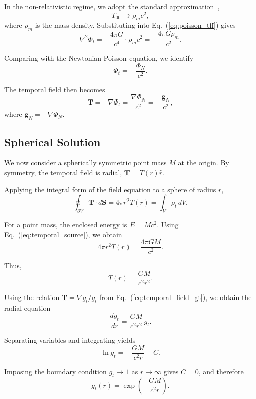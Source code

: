 \documentclass[12pt]{article}
\begin{document}
In the non-relativistic regime, we adopt the standard approximation~\cite{MTW1973},~\cite{Wald1984}
$$
T_{00} \to \rho_m c^2,
$$
where $\rho_m$ is the mass density. Substituting into Eq.~(\ref{eq:poisson_tff}) gives
\begin{equation}
\nabla^2 \Phi_t = -\frac{4\pi G}{c^4} \cdot \rho_m c^2 = -\frac{4\pi G\rho_m}{c^2} .
\end{equation}

Comparing with the Newtonian Poisson equation, we identify
\begin{equation}
\Phi_t = -\frac{\Phi_N}{c^2} .
\end{equation}

The temporal field then becomes
\begin{equation}
\mathbf{T} = -\nabla\Phi_t = \frac{\nabla\Phi_N}{c^2} = -\frac{\mathbf{g}_N}{c^2} ,
\end{equation}
where $\mathbf{g}_N = -\nabla\Phi_N$.

\subsection{Spherical Solution}
\label{sec:spherical}

We now consider a spherically symmetric point mass $M$ at the origin. By symmetry, the temporal field is radial, $\mathbf{T} = T(r)\hat{r}$.

Applying the integral form of the field equation to a sphere of radius $r$,
$$
\oint_{\partial V} \mathbf{T} \cdot d\mathbf{S} = 4\pi r^2 T(r) = \int_V \rho_t \, dV .
$$

For a point mass, the enclosed energy is $E = Mc^2$. Using Eq.~(\ref{eq:temporal_source}), we obtain
$$
4\pi r^2 T(r) = \frac{4\pi GM}{c^2} .
$$

Thus,
\begin{equation}
T(r) = \frac{GM}{c^2 r^2} .
\label{eq:temporal_field_spherical}
\end{equation}

Using the relation $\mathbf{T} = \nabla g_t / g_t$ from Eq.~(\ref{eq:temporal_field_gt}), we obtain the radial equation
$$
\frac{dg_t}{dr} = \frac{GM}{c^2 r^2} \, g_t .
$$

Separating variables and integrating yields
$$
\ln g_t = -\frac{GM}{c^2 r} + C .
$$

Imposing the boundary condition $g_t \to 1$ as $r \to \infty$ gives $C=0$, and therefore
\begin{equation}
g_t(r) = \exp\left(-\frac{GM}{c^2 r}\right) .
\label{eq:gt_spherical}
\end{equation}
\end{document}

